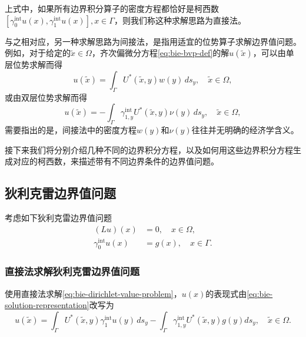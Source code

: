 上式中，如果所有边界积分算子的密度方程都恰好是柯西数$\left[ \gamma_{0}^{\text{int}} u(x), \gamma_{1}^{\text{int}} u(x) \right], x \in \Gamma$，则我们称这种求解思路为直接法。

与之相对应，另一种求解思路为间接法，是指用适宜的位势算子求解边界值问题。例如，对于给定的$\widetilde{x} \in \Omega$，齐次偏微分方程\eqref{eq:bie-bvp-def}的解$u(\widetilde{x})$，可以由单层位势求解而得
\begin{equation}
  \label{eq:bie-indirect-single-layer}
  u(\widetilde{x}) = \int_{\Gamma} U^{*}(\widetilde{x}, y) w(y) \, d s_{y}, \quad \widetilde{x} \in \Omega,
\end{equation}
或由双层位势求解而得
\begin{equation}
  \label{eq:bie-indirect-double-layer}
  u(\widetilde{x}) = - \int_{\Gamma}
  \gamma_{1,y}^{\text{int}} U^{*}(\widetilde{x}, y) \nu(y) \, d s_{y}, \quad \widetilde{x} \in \Omega,
\end{equation}
需要指出的是，间接法中的密度方程$w(y)$和$\nu(y)$往往并无明确的经济学含义。

接下来我们将分别介绍几种不同的边界积分方程，以及如何用这些边界积分方程生成对应的柯西数，来描述带有不同边界条件的边界值问题。

\subsection{狄利克雷边界值问题}
\label{sec:bie-dirichlet}
考虑如下狄利克雷边界值问题
\begin{equation}
  \label{eq:bie-dirichlet-value-problem}
  \begin{split}
    \left( L u \right)(x) &=0, \quad x \in \Omega,\\
    \gamma_{0}^{\text{int}} u(x) &= g(x), \quad x \in \Gamma.
  \end{split}
\end{equation}

\subsubsection{直接法求解狄利克雷边界值问题}
\label{sec:bie-dirichlet-direct-approach}
使用直接法求解\eqref{eq:bie-dirichlet-value-problem}，$u(x)$的表现式由\eqref{eq:bie-solution-representation}改写为
\begin{equation}
  \label{eq:bie-dirichlet-solution-representation}
  u(\widetilde{x}) = \int_{\Gamma} U^{*}(\widetilde{x}, y) \gamma_{1}^{\text{int}} u(y) \, d s_{y}
  - \int_{\Gamma} \gamma_{1,y}^{\text{int}} U^{*}(\widetilde{x}, y) g(y) d s_{y}, \quad \widetilde{x} \in \Omega.
\end{equation}

